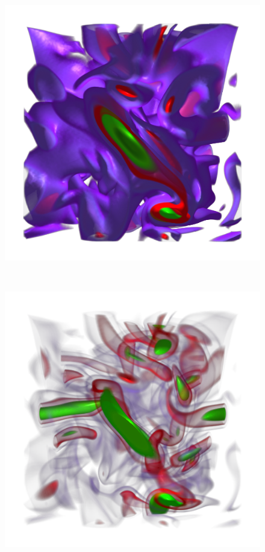 \begin{figure}
	\centering
	\begin{minipage}{.4\textwidth}
		\includegraphics[width=1\linewidth]{images/vortex_naive}
		\subcaption{}
	\end{minipage}~
	\begin{minipage}{.4\textwidth}
		\includegraphics[width=1\linewidth]{images/vortex_naive_optimized_fixed}
		\subcaption{}
	\end{minipage}


\end{figure}
